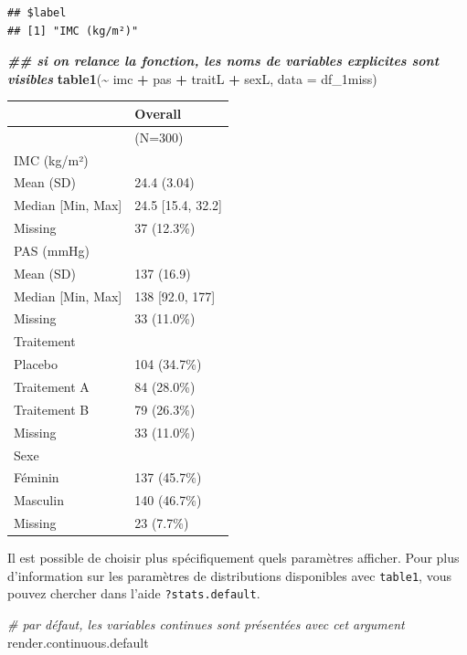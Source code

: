 \documentclass[
]{book}
\newenvironment{Shaded}{\begin{snugshade}}{\end{snugshade}}
\newcommand{\AttributeTok}[1]{\textcolor[rgb]{0.13,0.29,0.53}{#1}}
\newcommand{\CommentTok}[1]{\textcolor[rgb]{0.56,0.35,0.01}{\textit{#1}}}
\newcommand{\DocumentationTok}[1]{\textcolor[rgb]{0.56,0.35,0.01}{\textbf{\textit{#1}}}}
\newcommand{\FunctionTok}[1]{\textcolor[rgb]{0.13,0.29,0.53}{\textbf{#1}}}
\newcommand{\NormalTok}[1]{#1}
\newcommand{\SpecialCharTok}[1]{\textcolor[rgb]{0.81,0.36,0.00}{\textbf{#1}}}
\begin{document}
\begin{verbatim}
## $label
## [1] "IMC (kg/m²)"
\end{verbatim}

\begin{Shaded}
\begin{Highlighting}[]
\DocumentationTok{\#\# si on relance la fonction, les noms de variables explicites sont visibles}
\FunctionTok{table1}\NormalTok{(}\SpecialCharTok{\textasciitilde{}}\NormalTok{ imc }\SpecialCharTok{+}\NormalTok{ pas }\SpecialCharTok{+}\NormalTok{ traitL }\SpecialCharTok{+}\NormalTok{ sexL, }\AttributeTok{data =}\NormalTok{ df\_1miss)}
\end{Highlighting}
\end{Shaded}

\begin{tabular}{ll}
\toprule
  & Overall\\
\midrule
 & (N=300)\\
IMC (kg/m²) & \\
Mean (SD) & 24.4 (3.04)\\
Median [Min, Max] & 24.5 [15.4, 32.2]\\
Missing & 37 (12.3\%)\\
\addlinespace
PAS (mmHg) & \\
Mean (SD) & 137 (16.9)\\
Median [Min, Max] & 138 [92.0, 177]\\
Missing & 33 (11.0\%)\\
Traitement & \\
\addlinespace
Placebo & 104 (34.7\%)\\
Traitement A & 84 (28.0\%)\\
Traitement B & 79 (26.3\%)\\
Missing & 33 (11.0\%)\\
Sexe & \\
\addlinespace
Féminin & 137 (45.7\%)\\
Masculin & 140 (46.7\%)\\
Missing & 23 (7.7\%)\\
\bottomrule
\end{tabular}

Il est possible de choisir plus spécifiquement quels paramètres afficher. Pour plus d'information sur les paramètres de distributions disponibles avec \texttt{table1}, vous pouvez chercher dans l'aide \texttt{?stats.default}.

\begin{Shaded}
\begin{Highlighting}[]
\CommentTok{\# par défaut, les variables continues sont présentées avec cet argument}
\NormalTok{render.continuous.default}
\end{Highlighting}
\end{Shaded}
\end{document}
